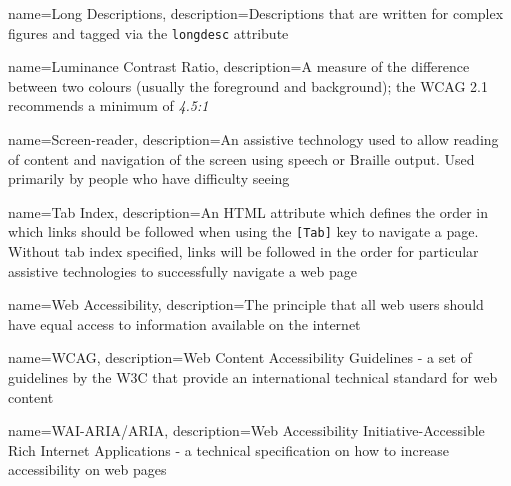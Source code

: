 {
    name=Long Descriptions,
    description={Descriptions that are written for complex figures and tagged via the \texttt{longdesc} attribute}
}

{
    name=Luminance Contrast Ratio,
    description={A measure of the difference between two colours (usually the foreground and background); the WCAG 2.1 recommends a minimum of \textit{4.5:1}}
}

{
    name=Screen-reader,
    description={An assistive technology used to allow reading of content and navigation of the screen using speech or Braille output. Used primarily by people who have difficulty seeing}
}

{
    name=Tab Index,
    description={An HTML attribute which defines the order in which links should be followed when using the \texttt{[Tab]} key to navigate a page. Without tab index specified, links will be followed in the order for particular assistive technologies to successfully navigate a web page}
}

{
    name=Web Accessibility,
    description={The principle that all web users should have equal access to information available on the internet}
}

{
    name=WCAG,
    description={Web Content Accessibility Guidelines - a set of guidelines by the W3C that provide an international technical standard for web content}
}

{
    name=WAI-ARIA/ARIA,
    description={Web Accessibility Initiative-Accessible Rich Internet Applications - a technical specification on how to increase accessibility on web pages}
}